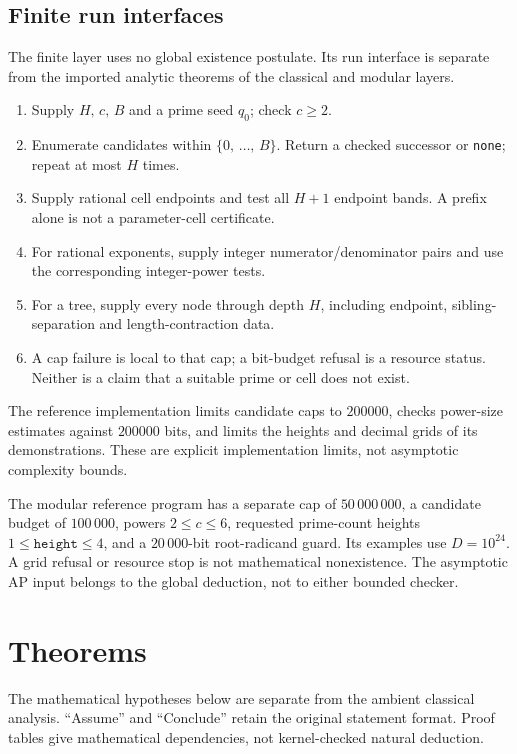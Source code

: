 \documentclass[11pt,reqno]{amsart}
\theoremstyle{blueplain}
\providecommand{\comma}{\allowbreak,\,}
\numberwithin{equation}{section}
\begin{document}
\subsection{Finite run interfaces}
The finite layer uses no global existence postulate. Its run interface is
separate from the imported analytic theorems of the classical and modular layers.
\begin{enumerate}
\item Supply \(H\comma c\comma B\) and a prime seed \(q_0\); check \(c\ge2\).
\item Enumerate candidates within \(\{0\comma \ldots\comma B\}\). Return a checked
successor or \texttt{none}; repeat at most \(H\) times.
\item Supply rational cell endpoints and test all \(H+1\) endpoint bands.
A prefix alone is not a parameter-cell certificate.
\item For rational exponents, supply integer numerator/denominator pairs
and use the corresponding integer-power tests.
\item For a tree, supply every node through depth \(H\), including endpoint,
sibling-separation and length-contraction data.
\item A cap failure is local to that cap; a bit-budget refusal is a resource
status. Neither is a claim that a suitable prime or cell does not exist.
\end{enumerate}
The reference implementation limits candidate caps to \(200000\), checks
power-size estimates against \(200000\) bits, and limits the heights and
decimal grids of its demonstrations. These are explicit implementation
limits, not asymptotic complexity bounds.


The modular reference program has a separate cap of \(50\,000\,000\),
a candidate budget of \(100\,000\), powers \(2\le c\le6\), requested
prime-count heights \(1\le\texttt{height}\le4\), and a \(20\,000\)-bit
root-radicand guard. Its examples use \(D=10^{24}\). A grid refusal or
resource stop is not mathematical nonexistence. The asymptotic AP input
belongs to the global deduction, not to either bounded checker.

\section{Theorems}\label{sec:theorems}
The mathematical hypotheses below are separate from the ambient classical
analysis. ``Assume'' and ``Conclude'' retain the original statement format.
Proof tables give mathematical dependencies, not kernel-checked natural deduction.
\end{document}
